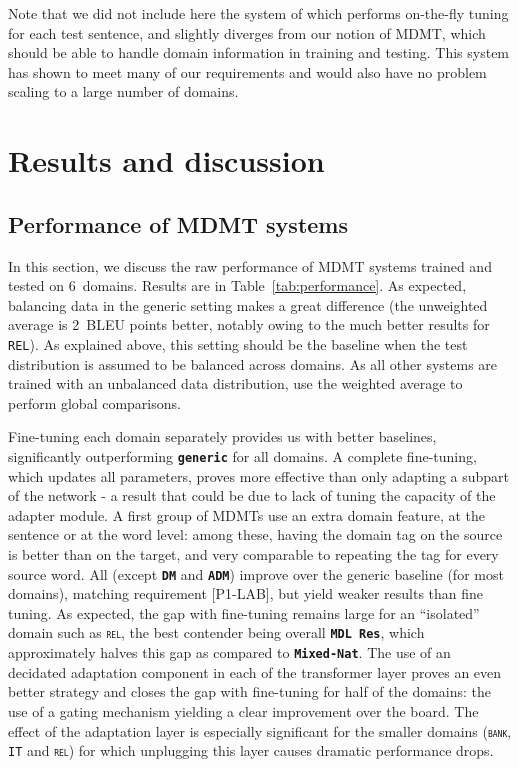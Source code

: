\documentclass[11pt]{article}
\newcommand{\fyTodo}[1]{\Todo[FY:]{\textcolor{orange}{#1}}}
\newcommand{\fyDone}[1]{\done[FY]\Todo[FY:]{\textcolor{orange}{#1}}}
\newcommand{\jcDone}[1]{\done[JC]\Todo[JC:]{\textcolor{blue}{#1}}}
\newcommand{\domain}[1]{\texttt{\textsc{#1}}}
\newcommand{\system}[1]{\texttt{\textbf{#1}}}
\begin{document}
Note that we did not include here the system of \cite{Farajian17multidomain} which performs on-the-fly tuning for each test sentence, and slightly diverges from our notion of MDMT, which should be able to handle domain information in training and testing. This system has shown to meet many of our requirements and would also have no problem scaling to a large number of domains.\fyTodo{TBC}

\section{Results and discussion \label{sec:results}}
\subsection{Performance of MDMT systems \label{ssec:rawperformance}}
In this section, we discuss the raw performance of MDMT systems trained and tested on $6$~domains. Results are in Table~\ref{tab:performance}. As expected, balancing data in the generic setting makes a great difference (the unweighted average is 2~BLEU points \jcDone{BP?} better, notably owing to the much better results for \domain{REL}). As explained above, this setting should be the baseline when the test distribution is assumed to be balanced across domains. As all other systems are trained with an unbalanced data distribution, use the weighted average to perform global comparisons.

Fine-tuning each domain separately provides us with better baselines, significantly outperforming \system{generic} for all domains. A complete fine-tuning, which updates all parameters, proves more effective than only adapting a subpart of the network - a result that could be due to lack of tuning the capacity of the adapter module. \fyDone{Add 2 averages ?}\fyTodo{Significance testing wrt Mix Generic, Full Fine-tuned, for each domain}
A  first group of MDMTs use an extra domain feature, at the sentence or at the word level: among these, having the domain tag on the source is better than on the target, and very comparable to repeating the tag for every source word. All (except \system{DM} and \system{ADM}) improve over the generic baseline (for most domains), matching requirement [P1-LAB], but yield weaker results than fine tuning. As expected, the gap with fine-tuning remains large for an ``isolated'' domain such as \domain{rel}, the best contender being overall \system{MDL Res}, which approximately halves this gap as compared to \system{Mixed-Nat}.
\fyTodo{More comments when we have all the results}
The use of an decidated adaptation component in each of the transformer layer proves an even better strategy and closes the gap with fine-tuning for half of the domains: the use of a gating mechanism yielding a clear improvement over the board. The effect of the adaptation layer is especially significant for the smaller domains (\domain{bank}, \domain{IT} and \domain{rel}) for which unplugging this layer causes dramatic performance drops. 
\end{document}

